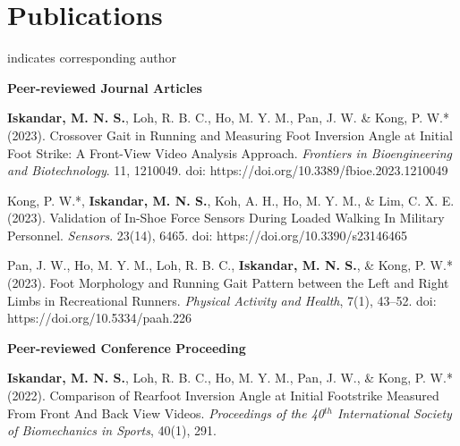 \documentclass[../main.tex]{subfiles}
\begin{document}
\section{Publications} 
  \vspace{2pt}
  \resumeSubHeadingListStart
    \item
        \small \normalfont * indicates corresponding author
    \item
        \textbf{Peer-reviewed Journal Articles} 
        \def\labelprefix{J}
        \begin{etaremune}
            \item\label{article: frontiers foot inversion} {\textbf{Iskandar, M. N. S.}, Loh, R. B. C., Ho, M. Y. M., Pan, J. W. \& Kong, P. W.* (2023). Crossover Gait in Running and Measuring Foot Inversion Angle at Initial Foot Strike: A Front-View Video Analysis Approach. \textit{Frontiers in Bioengineering and Biotechnology}. 11, 1210049. doi: https://doi.org/10.3389/fbioe.2023.1210049 \href{https://doi.org/10.3389/fbioe.2023.1210049}{\faFilePdfO}} %
            
            \item\label{article: sensors validation exoskeletal} {Kong, P. W.*, \textbf{Iskandar, M. N. S.}, Koh, A. H., Ho, M. Y. M., \& Lim, C. X. E. (2023). Validation of In-Shoe Force Sensors During Loaded Walking In Military Personnel. \textit{Sensors}. 23(14), 6465. doi: https://doi.org/10.3390/s23146465 \href{https://doi.org/10.3390/s23146465}{\faFilePdfO}} %
            
            \item\label{article: paah foot morphology} {Pan, J. W., Ho, M. Y. M., Loh, R. B. C., \textbf{Iskandar, M. N. S.}, \& Kong, P. W.* (2023). Foot Morphology and Running Gait Pattern between the Left and Right Limbs in Recreational Runners. \textit{Physical Activity and Health}, 7(1), 43–52. doi: https://doi.org/10.5334/paah.226 \href{https://doi.org/10.5334/paah.226}{\faFilePdfO}} %
        \end{etaremune}
                
        \textbf{Peer-reviewed Conference Proceeding}
        \def\labelprefix{C}
        \begin{etaremune}
            \item\label{conference: isbs2022} {\textbf{Iskandar, M. N. S.}, Loh, R. B. C., Ho, M. Y. M., Pan, J. W., \& Kong, P. W.* (2022). Comparison of Rearfoot Inversion Angle at Initial Footstrike Measured From Front And Back View Videos. \textit{Proceedings of the 40$^{th}$ International Society of Biomechanics in Sports}, 40(1), 291. \href{https://commons.nmu.edu/isbs/vol40/iss1/70/}{\faFilePdfO}}
        \end{etaremune}
\end{document}
